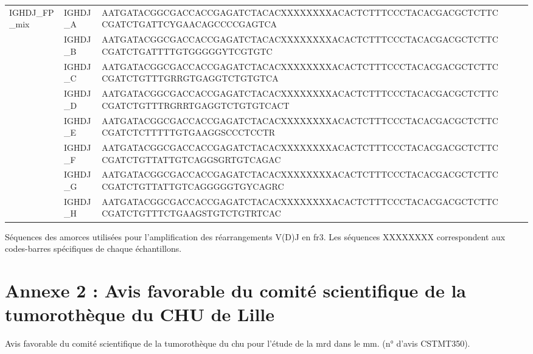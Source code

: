 \begin{annex}[htbp]
{\begin{tabular}{lllp{7cm}rr}
IGHDJ\_FP\_mix & IGHDJ\_A & AATGATACGGCGACCACCGAGATCTACACXXXXXXXXACACTCTTTCCCTACACGACGCTCTTCCGATCTGATTCYGAACAGCCCCGAGTCA \\
& IGHDJ\_B & AATGATACGGCGACCACCGAGATCTACACXXXXXXXXACACTCTTTCCCTACACGACGCTCTTCCGATCTGATTTTGTGGGGGYTCGTGTC \\
& IGHDJ\_C & AATGATACGGCGACCACCGAGATCTACACXXXXXXXXACACTCTTTCCCTACACGACGCTCTTCCGATCTGTTTGRRGTGAGGTCTGTGTCA \\
& IGHDJ\_D & AATGATACGGCGACCACCGAGATCTACACXXXXXXXXACACTCTTTCCCTACACGACGCTCTTCCGATCTGTTTRGRRTGAGGTCTGTGTCACT \\
& IGHDJ\_E & AATGATACGGCGACCACCGAGATCTACACXXXXXXXXACACTCTTTCCCTACACGACGCTCTTCCGATCTCTTTTTGTGAAGGSCCCTCCTR \\
& IGHDJ\_F & AATGATACGGCGACCACCGAGATCTACACXXXXXXXXACACTCTTTCCCTACACGACGCTCTTCCGATCTGTTATTGTCAGGSGRTGTCAGAC \\
& IGHDJ\_G & AATGATACGGCGACCACCGAGATCTACACXXXXXXXXACACTCTTTCCCTACACGACGCTCTTCCGATCTGTTATTGTCAGGGGGTGYCAGRC \\
& IGHDJ\_H & AATGATACGGCGACCACCGAGATCTACACXXXXXXXXACACTCTTTCCCTACACGACGCTCTTCCGATCTGTTTCTGAAGSTGTCTGTRTCAC \\

\hline
\end{tabular}
}
\caption{
    Séquences des amorces utilisées pour l'amplification des réarrangements V(D)J en \gls{fr}3.
    Les séquences XXXXXXXX correspondent aux codes-barres spécifiques de chaque échantillons.
    }
\label{anx:primer-sequences}
\end{annex}

\newpage

\section*{Annexe 2 : Avis favorable du comité scientifique de la tumorothèque du CHU de Lille}

\begin{annex}[htbp]
    \begin{center}
        \caption{
            Avis favorable du comité scientifique de la tumorothèque du \gls{chu} pour l'étude de la \gls{mrd} dans le \gls{mm}.
            (n° d'avis CSTMT350).
        }
        \label{anx:cstmt-mrd-mm}
    \end{center}
\end{annex}